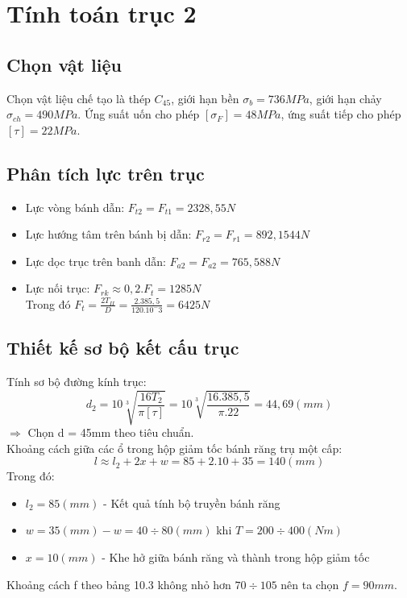 \section{Tính toán trục 2}
\subsection{Chọn vật liệu}
Chọn vật liệu chế tạo là thép $C_{45}$, giới hạn bền $\sigma_b =736MPa$, giới hạn chảy $\sigma_{ch} = 490MPa$.
Ứng suất uốn cho phép $[\sigma_F] = 48MPa$, ứng suất tiếp cho phép $[\tau] = 22MPa$.
\subsection{Phân tích lực trên trục}
\begin{itemize}
    \item Lực vòng bánh dẫn: $F_{t2} = F_{t1} = 2328,55N$
    \item Lực hướng tâm trên bánh bị dẫn: $F_{r2} = F_{r1} = 892,1544N$
    \item Lực dọc trục trên banh dẫn: $F_{a2} = F_{a2} = 765,588N$
    \item Lực nối trục: $F_{rk} \approx 0,2.F_{t} = 1285N$ \\
    Trong đó $F_t = \frac{2T_{II}}{D} = \frac{2.385,5}{120.10^-3} = 6425N$
\end{itemize}
\subsection{Thiết kế sơ bộ kết cấu trục}
Tính sơ bộ đường kính trục: \\
\[
    d_2 = 10\sqrt[3]{\frac{16T_2}{\pi[\tau]}} = 10\sqrt[3]{\frac{16.385,5}{\pi.22}} = 44,69(mm)
\]
$\Rightarrow$ Chọn d = 45mm theo tiêu chuẩn. \\
Khoảng cách giữa các ổ trong hộp giảm tốc bánh răng trụ một cấp: \\
\[
    l \approx l_2 + 2x + w = 85 + 2.10 + 35 = 140(mm)
\]
Trong đó: 
\begin{itemize}
    \item $l_2 = 85(mm)$ - Kết quả tính bộ truyền bánh răng
    \item $w = 35(mm) - w = 40 \div 80(mm)$ khi $T = 200 \div 400(Nm)$
    \item $x = 10(mm)$ - Khe hở giữa bánh răng và thành trong hộp giảm tốc
\end{itemize}
Khoảng cách f theo bảng 10.3 không nhỏ hơn $70 \div 105$ nên ta chọn $f = 90mm.$
